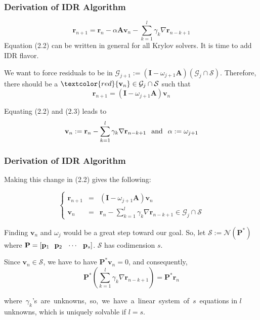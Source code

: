 \documentclass[mathserif]{beamer}
\begin{document}
\begin{frame}
\frametitle{Derivation of IDR Algorithm}
\begin{equation}\tag{2.2} \mathbf{r}_{n+1} =\mathbf{r}_n-\alpha \mathbf{A} \mathbf{v}_n-\sum \limits_ {k=1}^l \gamma_k \nabla \mathbf{r}_{n-k+1} \end{equation}
Equation (2.2) can be written in general for all Krylov solvers. It is time to add IDR flavor.\\
\pause

\vspace{.1in}We want to force residuals to be in $\mathcal{G}_{j+1}:=(\mathbf{I}-\omega_{j+1}\mathbf{A})(\mathcal{G}_{j}\cap \mathcal{S})$. 
Therefore, there should be a $\textcolor{red}{\mathbf{v}_n} \in \mathcal{G}_j\cap \mathcal{S}$ such that \begin{equation}\tag{2.3}\mathbf{r}_{n+1}=(\mathbf{I}-\omega_{j+1}\mathbf{A})\mathbf{v}_n\end{equation}


\pause
Equating (2.2) and (2.3) leads to \[\mathbf{v}_n := \mathbf{r}_n-\sum \limits_ {k=1}^l \gamma_k \nabla \mathbf{r}_{n-k+1} \hspace{.1in} \text{and}  \hspace{.1in} \alpha:=\omega_{j+1}\]  
\end{frame}


\begin{frame}
\frametitle{Derivation of IDR Algorithm}
Making this change in (2.2) gives the following:

\[\left\{ \tag{2.4}\begin{array}{llll} \mathbf{r}_{n+1} &=& (\mathbf{I}-\omega_{j+1} \mathbf{A}) \mathbf{v}_n\\ \mathbf{v}_n&=&\mathbf{r}_n-\sum \limits_ {k=1}^l \gamma_k \nabla \mathbf{r}_{n-k+1} \in \mathcal{G}_j\cap \mathcal{S}\end{array}\right.\]

\pause
Finding $\mathbf{v}_n$ and $\omega_j$ would be a great step toward our goal. So, let $\mathcal{S}:=\mathcal{N}(\mathbf{P}^*)$ where $\mathbf{P}=[\mathbf{p}_1 \hspace{.1in} \mathbf{p}_2 \hspace{.1in}  \cdots \hspace{.1in}  \mathbf{p}_s]$.  $\mathcal{S}$ has codimension $s$.
\vspace{.1in}

\pause
Since $\mathbf{v}_n \in \mathcal{S}$, we have to have $\mathbf{P}^*\mathbf{v}_n=0$, and consequently, \\
\[\mathbf{P}^*(\sum \limits_ {k=1}^l \gamma_k \nabla \mathbf{r}_{n-k+1}) =\mathbf{P}^*\mathbf{r}_n\]

\pause
\mbox{where $\gamma_k$'s are unknowns, so, we have a linear system of $s$ equations} in $l$ unknowns, which is uniquely solvable if $l=s.$
\end{frame}
\end{document}

